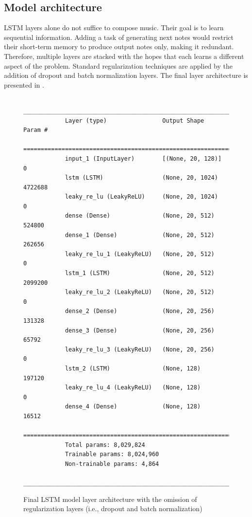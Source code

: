 \documentclass[a4paper, 11pt, twoside]{report}
\theoremstyle{definition}
\begin{document}
\subsection{Model architecture}

LSTM layers alone do not suffice to compose music. Their goal is to learn sequential information. Adding a task of generating next notes would restrict their short-term memory to produce output notes only, making it redundant. Therefore, multiple layers are stacked with the hopes that each learns a different aspect of the problem. Standard regularization techniques are applied by the addition of dropout and batch normalization layers. The final layer architecture is presented in . \par

\begin{figure}
    \centering
    \begin{tiny}
        \begin{BVerbatim}
            _________________________________________________________________
            Layer (type)                Output Shape              Param #
            =================================================================
            input_1 (InputLayer)        [(None, 20, 128)]         0
            lstm (LSTM)                 (None, 20, 1024)          4722688
            leaky_re_lu (LeakyReLU)     (None, 20, 1024)          0
            dense (Dense)               (None, 20, 512)           524800
            dense_1 (Dense)             (None, 20, 512)           262656
            leaky_re_lu_1 (LeakyReLU)   (None, 20, 512)           0
            lstm_1 (LSTM)               (None, 20, 512)           2099200
            leaky_re_lu_2 (LeakyReLU)   (None, 20, 512)           0
            dense_2 (Dense)             (None, 20, 256)           131328
            dense_3 (Dense)             (None, 20, 256)           65792
            leaky_re_lu_3 (LeakyReLU)   (None, 20, 256)           0
            lstm_2 (LSTM)               (None, 128)               197120
            leaky_re_lu_4 (LeakyReLU)   (None, 128)               0
            dense_4 (Dense)             (None, 128)               16512
            =================================================================
            Total params: 8,029,824
            Trainable params: 8,024,960
            Non-trainable params: 4,864
            _________________________________________________________________
        \end{BVerbatim}
    \end{tiny}
    \caption{Final LSTM model layer architecture with the omission of regularization layers (i.e., dropout and batch normalization)}
    \label{fig:lstm_arch}
\end{figure}
\end{document}
